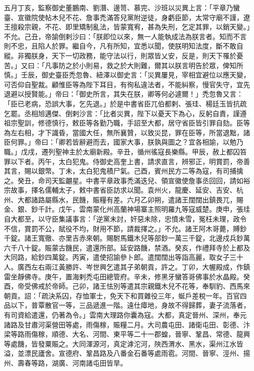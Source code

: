 \begin{pinyinscope}
 五月丁亥，監察御史董鵬南、劉潛、邊笥、慕完、沙班以災異上言：「平章乃蠻臺、宣徽院使帖木兒不花、詹事禿滿答兒黨附逆徒，身虧臣節，太常守廟不謹，遼王擅殺宗親，不花、即里矯制亂法，皆蒙寬宥，甚為失刑，乞定其罪，以銷天變。」不允。己丑，帝諭倒剌沙曰：「朕即位以來，無一人能執成法為朕言者。知而不言則不忠，且陷人於罪。繼自今，凡有所知，宜悉以聞，使朕明知法度，斷不敢自縱。非獨朕身，天下一切政務，能守法以行，則眾皆乂安，反是，則天下罹於憂苦。」又曰：「凡事防之於小則易，救之於大則難，爾其以朕言明告於眾，俾知所慎。」壬辰，御史臺臣禿忽魯、紐澤以御史言：「災異屢見，宰相宜避位以應天變，可否仰自聖裁。顧惟臣等為陛下耳目，有徇私違法者，不能糾察，慢官失守，宜先退避以授賢能。」帝曰：「御史所言，其失在朕，卿等何必遽爾！」禿忽魯又言：「臣已老病，恐誤大事，乞先退。」於是中書省臣兀伯都剌、張珪、楊廷玉皆抗疏乞罷。丞相旭邁傑、倒剌沙言：「比者災異，陛下以憂天下為心，反躬自責，謹遵祖宗聖訓，修德慎行，敕臣等各勤乃職，手詔至大都，居守省臣皆引罪自劾。臣等為左右相，才下識昏，當國大任，無所襄贊，以致災昆，罪在臣等，所當退黜，諸臣何罪。」帝曰：「卿若皆辭避而去，國家大事，朕孰與圖之？宜各相諭，以勉乃職。」戊戌，遷列聖神主於太廟新殿。辛丑，循州徭寇長樂縣。甲辰，赦上都囚笞罪以下者。丙午，太白犯鬼。侍御史高奎上書，請求直言，辨邪正，明賞罰，帝善其言，賜以銀幣。丁未，太白犯鬼積尸氣。己酉，賓州民方二等為寇，有司捕擒之。癸丑，命司天監翽星。中書平章政事禿滿迭兒、領宣徽使詹事丞回回，請如裕宗故事，擇名儒輔太子，敕中書省臣訪求以聞。袁州火，龍慶、延安、吉安、杭州、大都諸路屬縣水，民饑，賑糧有差。六月乙卯朔，遣諸王闊闊出鎮畏兀，賜金、銀、鈔千計。戊午，雲南蒙化州高蘭神場寨主照明羅九等寇威楚。庚申，張珪自大都至，以守臣集議事言：「逆黨未討，奸惡未除，忠憤未雪，冤枉未理，政令不信，賞罰不公，賦役不均，財用不節，請裁擇之。」不允。諸王阿木哥薨，賻鈔千錠。諸王寬徹、亦里吉赤來朝。賜駙馬鐵木兒等部鈔一萬三千錠，北邊戍兵鈔萬六千八十錠。賑蒙古饑民，遣還所部。延安路饑，禁酒。癸亥，作禮拜寺於上都及大同路，給鈔四萬錠。丙寅，遣使招諭參卜郎。遣闊闊出等詣高麗，取女子三十人。廣西左右兩江黃勝許、岑世興乞遣其子弟朝貢，許之。丁卯，大幄殿成，作鎮雷坐靜佛寺。庚午，置海剌禿屯田總管府。辛未，修黑牙蠻答哥佛事於水晶殿。癸酉，帝受佛戒於帝師。己卯，諸王怯別等遣其宗親鐵木兒不花等，奉馴豹、西馬來朝貢。詔：「疏決系囚，存恤軍士，免天下和買雜役三年，蜒戶差稅一年。百官四品以下，普覃散官一等，三品遞進一階。遠仕瘴地，身故不得歸葬，妻子流落者，有司資給遣還，仍著為令。」雲南大理路你囊為寇。大都，真定晉州、深州，奉元諸路及甘肅河渠營田等處，雨傷稼，賑糧二月。大司農屯田、諸衛屯田、彰德、汴梁等路雨傷稼，順德、大名、河間、東平等二十一郡蝗，晉寧、鞏昌、常德、龍興等處饑，皆發粟賑之。大同渾源河，真定滹沱河，陜西渭水、黑水，渠州江水皆溢，並漂民廬舍。宣德府、鞏昌路及八番金石番等處雨雹。河間、晉寧、涇州、揚州、壽春等路，湖廣、河南諸屯田皆旱。




\end{pinyinscope}
